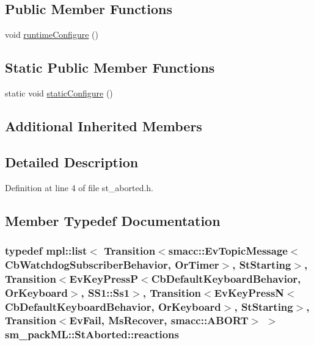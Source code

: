 \subsection*{Public Member Functions}
\begin{DoxyCompactItemize}
\item 
void \hyperlink{structsm__packML_1_1StAborted_ac10c7a9d4b4e58196324d1cbbbe3497a}{runtime\+Configure} ()
\end{DoxyCompactItemize}
\subsection*{Static Public Member Functions}
\begin{DoxyCompactItemize}
\item 
static void \hyperlink{structsm__packML_1_1StAborted_ad9fe492ea5bd5c903ffba9ed612a084d}{static\+Configure} ()
\end{DoxyCompactItemize}
\subsection*{Additional Inherited Members}


\subsection{Detailed Description}


Definition at line 4 of file st\+\_\+aborted.\+h.



\subsection{Member Typedef Documentation}
\subsubsection[{\texorpdfstring{reactions}{reactions}}]{\setlength{\rightskip}{0pt plus 5cm}typedef mpl\+::list$<$ Transition$<${\bf smacc\+::\+Ev\+Topic\+Message}$<${\bf Cb\+Watchdog\+Subscriber\+Behavior}, {\bf Or\+Timer}$>$, {\bf St\+Starting}$>$, Transition$<$Ev\+Key\+PressP$<$Cb\+Default\+Keyboard\+Behavior, {\bf Or\+Keyboard}$>$, {\bf S\+S1\+::\+Ss1}$>$, Transition$<$Ev\+Key\+PressN$<$Cb\+Default\+Keyboard\+Behavior, {\bf Or\+Keyboard}$>$, {\bf St\+Starting}$>$, Transition$<${\bf Ev\+Fail}, {\bf Ms\+Recover}, {\bf smacc\+::\+A\+B\+O\+RT}$>$ $>$ {\bf sm\+\_\+pack\+M\+L\+::\+St\+Aborted\+::reactions}}\hypertarget{structsm__packML_1_1StAborted_a83e918849f9b2c3807d23f9677f8caba}{}\label{structsm__packML_1_1StAborted_a83e918849f9b2c3807d23f9677f8caba}


